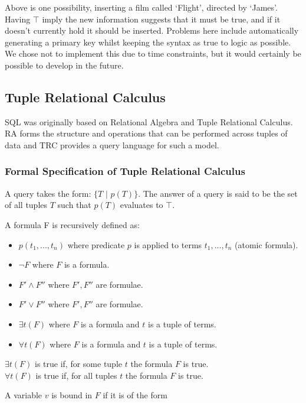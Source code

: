 \documentclass[a4paper, 11pt]{article}
\begin{document}
    Above is one possibility, inserting a film called `Flight', directed by
    `James'. Having $\top$ imply the new information suggests that it must be
    true, and if it doesn't currently hold it should be inserted. Problems here
    include automatically generating a primary key whilst keeping the syntax as
    true to logic as possible. We chose not to implement this due to time
    constraints, but it would certainly be possible to develop in the future.

  \subsection{Tuple Relational Calculus}
    SQL was originally based on Relational Algebra and Tuple Relational
    Calculus\cite{lecRA}. RA forms the structure and operations that can be performed
    across tuples of data and TRC provides a query language for such a model.

    \subsubsection{Formal Specification of Tuple Relational Calculus\cite{lecRA}}
      \label{sec:formalTRC}
      A query takes the form: $\{T\text{ | }p(T)\}$. The answer of a query is
      said to be the set of all tuples $T$ such that $p(T)$ evaluates to $\top$.

      A formula F is recursively defined as:
      \begin{itemize}
        \item $p(t_1, ..., t_n)$ where predicate $p$ is applied to terms $t_1, ..., t_n$ (atomic formula).
        \item $\lnot F$ where $F$ is a formula.
        \item $F' \land F''$ where $F', F''$ are formulae.
        \item $F' \lor F''$ where $F', F''$ are formulae.
        \item $\exists t(F)$ where $F$ is a formula and $t$ is a tuple of terms.
        \item $\forall t(F)$ where $F$ is a formula and $t$ is a tuple of terms.
      \end{itemize}

      $\exists t(F)$ is true if, for some tuple $t$ the formula $F$ is true. \\
      $\forall t(F)$ is true if, for all tuples $t$ the formula $F$ is true.

      A variable $v$ is bound in $F$ if it is of the form
\end{document}
